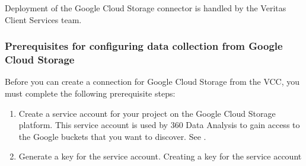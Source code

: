 \documentclass[letterpaper,10pt,english]{sphinxmanual}
\begin{document}
Deployment of the Google Cloud Storage connector is handled by the Veritas Client Services team.


\subsubsection{Prerequisites for configuring data collection from Google Cloud Storage}
\label{\detokenize{mcdmp_app_ug:prereq-google-cloud-storage}}\label{\detokenize{mcdmp_app_ug:prerequisites-for-configuring-data-collection-from-google-cloud-storage}}
Before you can create a connection for Google Cloud Storage from the VCC, you must complete the following prerequisite steps:
\begin{enumerate}
\item {} 
Create a service account for your project on the Google Cloud Storage platform. This service account is used by 360 Data Analysis to gain access to the Google buckets that you want to discover. See {\hyperref[\detokenize{mcdmp_app_ug:create-service-account}]{}}.

\item {} 
Generate a key for the service account. Creating a key for the service account

\end{enumerate}
\end{document}
